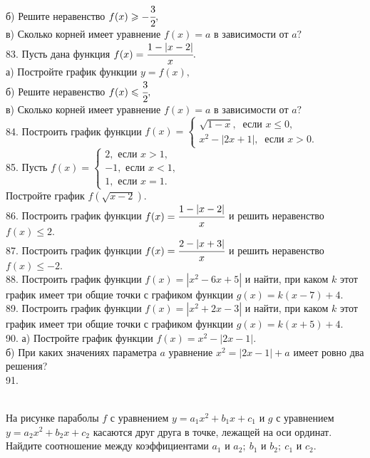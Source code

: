 б) Решите неравенство $f(x)\geqslant-\cfrac{3}{2},$\\
в) Сколько корней имеет уравнение $f(x)=a$ в зависимости от $a?$\\
83. Пусть дана функция $f(x)=\cfrac{1-|x-2|}{x}.$\\
а) Постройте график функции $y=f(x),$\\
б) Решите неравенство $f(x)\leqslant\cfrac{3}{2},$\\
в) Сколько корней имеет уравнение $f(x)=a$ в зависимости от $a?$\\
84. Построить график функции $f(x)=\begin{cases} \sqrt{1-x},\ \text{ если } x\leqslant0,\\
x^2-|2x+1|,\ \text{ если } x>0.\end{cases}$\\
85. Пусть $f(x)=\begin{cases} 2, \text{ если } x>1,\\ -1, \text{ если } x<1,\\ 1, \text{ если } x=1.\end{cases}$\\
Постройте график $f(\sqrt{x-2}).$\\
86. Построить график функции $f(x)=\cfrac{1-|x-2|}{x}$ и решить неравенство $f(x)\leqslant 2.$\\
87. Построить график функции $f(x)=\cfrac{2-|x+3|}{x}$ и решить неравенство $f(x)\leqslant -2.$\\
88. Построить график функции $f(x)=|x^2-6x+5|$ и найти, при каком $k$ этот график имеет три общие точки с графиком функции $g(x)=k(x-7)+4.$\\
89. Построить график функции $f(x)=|x^2+2x-3|$ и найти, при каком $k$ этот график имеет три общие точки с графиком функции $g(x)=k(x+5)+4.$\\
90. а) Постройте график функции $f(x)=x^2-|2x-1|.$\\
б) При каких значениях параметра $a$ уравнение $x^2=|2x-1|+a$ имеет ровно два решения?\\
91. \begin{figure}[ht!]
\end{figure}\\
На рисунке параболы $f$ с уравнением $y=a_1 x^2+b_1x+c_1$ и $g$ с уравнением $y=a_2 x^2+b_2x+c_2$ касаются друг друга в точке, лежащей на оси ординат. Найдите соотношение между коэффициентами $a_1$ и $a_2;\ b_1$ и $b_2;\ c_1$ и $c_2.$\\

